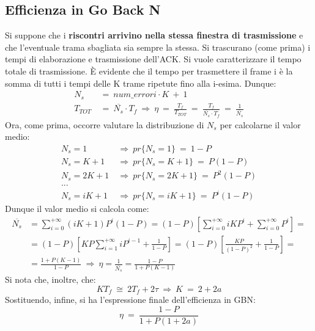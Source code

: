 \documentclass[12pt]{article}
\begin{document}
\subsection{Efficienza in Go Back N}

Si suppone che i \textbf{riscontri arrivino nella stessa finestra di trasmissione} e che l'eventuale trama sbagliata sia sempre la stessa. Si trascurano (come prima) i tempi di elaborazione e trasmissione dell'ACK. Si vuole caratterizzare il tempo totale di trasmissione. È evidente che il tempo per trasmettere il frame i è la somma di tutti i tempi delle K trame ripetute fino alla i-esima. Dunque:
\begin{align*}
    N_s\ &=\ num\_errori \cdot K\ +\ 1\\
    T_{TOT}\ &=\ \overline{N_s} \cdot T_f\ \Rightarrow\ \eta\ =\ \frac{T_f}{T_{TOT}}\ =\ \frac{T_f}{\overline{N_s} \cdot T_f}\ =\ \frac{1}{\overline{N_s}}
\end{align*}
Ora, come prima, occorre valutare la distribuzione di $N_s$ per calcolarne il valor medio:
\begin{align*}
    N_s = 1\ &\Rightarrow\ pr\{N_s = 1\}\ =\ 1 - P\\
    N_s = K + 1\ &\Rightarrow\ pr\{N_s = K + 1\}\ =\ P(1 - P)\\
    N_s = 2K + 1\ &\Rightarrow\ pr\{N_s = 2K + 1\}\ =\ P^2(1 - P)\\
    ...\\
    N_s = iK + 1\ &\Rightarrow\ pr\{N_s = iK + 1\}\ =\ P^i(1 - P)
\end{align*}
Dunque il valor medio si calcola come:
\begin{align*}
    \overline{N_s} &= \sum^{+\infty}_{i=0}(iK + 1)P^i(1 - P) = (1 - P)\left[\sum^{+\infty}_{i=0}iKP^i + \sum^{+\infty}_{i=0}P^i\right]=\\&= (1 - P)\left[KP\sum^{+\infty}_{i=1}iP^{i-1} + \frac{1}{1-P}\right] = (1-P)\left[\frac{KP}{(1-P)^2} + \frac{1}{1-P}\right]=\\&= \frac{1 + P(K - 1)}{1 - P}\ \Rightarrow\ \eta = \frac{1}{\overline{N_s}} = \frac{1-P}{1+P(K -1)}
\end{align*}
Si nota che, inoltre, che:
\begin{equation*}
    KT_f\ \cong\ 2T_f + 2\tau\ \Rightarrow\ K\ =\ 2 + 2a
\end{equation*}
Sostituendo, infine, si ha l'espressione finale dell'efficienza in GBN:
\begin{equation*}
    \eta\ =\ \frac{1-P}{1+P(1 + 2a)}
\end{equation*}
\end{document}
